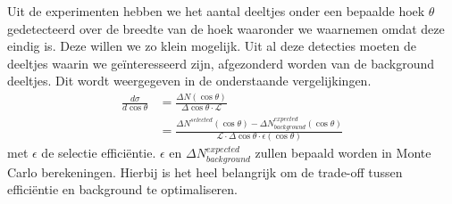 \documentclass[../main.tex]{subfiles}
\begin{document}
Uit de experimenten hebben we het aantal deeltjes onder een bepaalde hoek $\theta$ gedetecteerd over de breedte van de hoek waaronder we waarnemen omdat deze eindig is. Deze willen we zo klein mogelijk. Uit al deze detecties moeten de deeltjes waarin we geïnteresseerd zijn, afgezonderd worden van de background deeltjes. Dit wordt weergegeven in de onderstaande vergelijkingen.
\begin{equation}
    \begin{aligned}
        \label{eq:measure_cros_sec}
        \frac{d\sigma}{d\cos\theta} &= \frac{\Delta N(\cos\theta)}{\Delta \cos\theta\cdot\mathcal{L}} \\
                                    &= \frac{\Delta N^{selected}(\cos\theta)-\Delta N_{background}^{expected}(\cos\theta)}{\mathcal{L}\cdot\Delta\cos\theta\cdot\epsilon(\cos\theta)} 
    \end{aligned}
\end{equation}
met $\epsilon$ de selectie efficiëntie. $\epsilon$ en $\Delta N_{background}^{expected}$ zullen bepaald worden in Monte Carlo berekeningen. Hierbij is het heel belangrijk om de trade-off tussen efficiëntie en background te optimaliseren.
\end{document}
